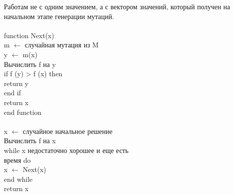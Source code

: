 Работам не с одним значением, а с вектором значений, который получен на начальном этапе генерации мутаций. \\
\\
function Next(x)  \\
\tab m $\leftarrow$ случайная мутация из M  \\
\tab y $\leftarrow$ m(x)  \\
\tab Вычислить f на y  \\
\tab if f (y) > f (x) then  \\
\tab\tab return y  \\
\tab end if  \\
\tab return x  \\
end function  \\
\\
x $\leftarrow$ случайное начальное решение  \\
Вычислить f на x  \\
while x недостаточно хорошее и еще есть  \\
время do  \\
\tab x $\leftarrow$ Next(x)  \\
end while   \\
return x \\
